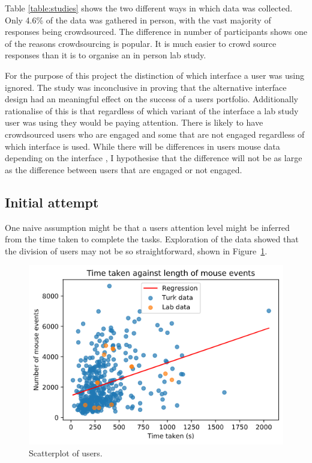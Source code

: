 \documentclass{article}
\begin{document}
Table \ref{table:studies} shows the two different ways in which data was collected.
Only 4.6\% of the data was gathered in person, with the vast majority of responses being crowdsourced.
The difference in number of participants shows one of the reasons crowdsourcing is popular. 
It is much easier to crowd source responses than it is to organise an in person lab study.

For the purpose of this project the distinction of which interface a user was using ignored.
The study was inconclusive in proving that the alternative interface design had an meaningful effect on the success of a users portfolio. 
Additionally rationalise of this is that regardless of which variant of the interface a lab study user was using they would be paying attention.
There is likely to have crowdsourced users who are engaged and some that are not engaged regardless of which interface is used.
While there will be differences in users mouse data depending on the interface
    , I hypothesise that the difference will not be as large as the difference between users that are engaged or not engaged. 

\subsection{Initial attempt}

One naive assumption might be that a users attention level might be inferred from the time taken to complete the tasks.
Exploration of the data showed that the division of users may not be so straightforward, shown in Figure~\ref{fig:scatterplot}.

\begin{figure}[ht]
    \centering
    \includegraphics[scale=0.6]{Images/TimeTaken-Mouse-Events.png}
    \caption{Scatterplot of users.}
    \label{fig:scatterplot}
\end{figure}
\end{document}
